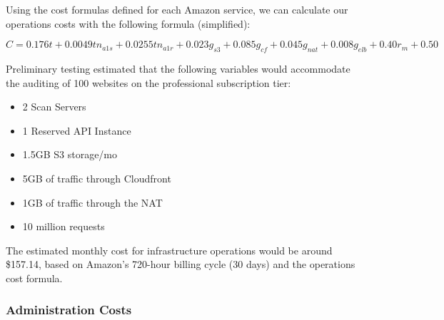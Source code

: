 \noindent
Using the cost formulas defined for each Amazon service, we can calculate our operations costs with the following formula (simplified):

\[
  C = 0.176t + 0.0049tn_{a1s} + 0.0255tn_{a1r} + 0.023g_{s3} + 0.085g_{cf} + 0.045g_{nat} + 0.008g_{elb} + 0.40r_{m} + 0.50
\]

\noindent
Preliminary testing estimated that the following variables would accommodate the auditing of 100 websites on the professional subscription tier:

\begin{itemize}

\item 2 Scan Servers
\item 1 Reserved API Instance
\item 1.5GB S3 storage/mo
\item 5GB of traffic through Cloudfront
\item 1GB of traffic through the NAT
\item 10 million requests

\end{itemize}

\noindent
The estimated monthly cost for infrastructure operations would be around \$157.14, based on Amazon's 720-hour billing cycle (30 days) \cite{aws.calc.2020} and the operations cost formula.

\subsubsection{Administration Costs} \label{section.admin.costs}

